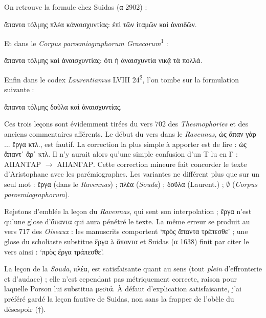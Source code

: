 \documentclass[12pt]{book}%
\newcommand{\italique}[1]{\textit{#1}}%
\newcommand{\citComm}[1]{\begin{quoting}[vskip=0pt] #1 \end{quoting}}%
\newcommand{\latin}[1]{{\policeLat #1}}%
\newcommand{\allemand}[1]{{\policeAll #1}}%
\newcommand{\marqueur}[1]{\textsuperscript{#1}}%
\newenvironment{groupe}{%
\pstart%
\ledgroup%
}{%
\pend %
}%
\begin{document}
\begin{pages}
\begin{Leftside}
\begin{groupe}
{{On retrouve la formule chez Suidas (α 2902) : 
\citComm{ἅπαντα τόλμης πλέα κἀναισχυντίας: ἐπὶ τῶν ἰταμῶν καὶ ἀναιδῶν.}
Et dans le \italique{Corpus paroemiographorum Graecorum}\marqueur{1} :
\citComm{ἅπαντα τόλμης καὶ ἀναισχυντίας: ὅτι ἡ ἀναισχυντία νικᾷ τὰ πολλά.}
Enfin dans le codex \italique{Laurentiamus} LVIII 24\marqueur{2}, l'on tombe sur la formulation suivante :%
\citComm{ἅπαντα τόλμης δοῦλα καὶ ἀναισχυντίας.}%
Ces trois leçons sont évidemment tirées du vers 702 des \italique{Thesmophories} et des anciens commentaires afférents. 
Le début du vers dans le \italique{Ravennas}, ὡς ἅπαν γὰρ ... ἔργα κτλ., est fautif. La correction la plus simple à apporter est de lire : ὡς ἅπαντ᾽ ἄρ᾽ κτλ. %
Il n'y aurait alors qu'une simple confusion d'un Τ lu en Γ : ΑΠΑΝΤΑΡ $ \to $ ΑΠΑΝΓΑΡ.
Cette correction mineure fait concorder le texte d'Aristophane avec les parémiographes. %
Les variantes ne différent plus que sur un seul mot : ἔργα (dans le \italique{Ravennas}) ; πλέα (\italique{Souda}) ; δοῦλα (Laurent.) ; $\emptyset$ (\italique{Corpus paroemiographorum}).

Rejetons d'emblée la leçon du \italique{Ravennas}, qui sent son interpolation ; ἔργα n'est qu'une glose d'ἅπαντα qui aura pénétré le texte.
La même erreur se produit au vers 717 des \italique{Oiseaux} : les manuscrits comportent `πρὸς ἅπαντα τρέπεσθε' ; une glose du scholiaste substitue ἔργα à ἅπαντα et Suidas (α 1638) finit par citer le vers ainsi : `πρὸς ἔργα τράπεσθε'.

La leçon de la \italique{Souda}, πλέα, est satisfaisante quant au sens (tout \italique{plein} d'effronterie et d'audace) ; elle n'est cependant pas métriquement correcte, raison pour laquelle Porson lui substitua μεστά. 
À défaut d'explication satisfaisante, j'ai préféré gardé la leçon fautive de Suidas, non sans la frapper de l'obèle du désespoir (†).

}}
\end{groupe}
\end{Leftside}
\end{pages}
\end{document}
